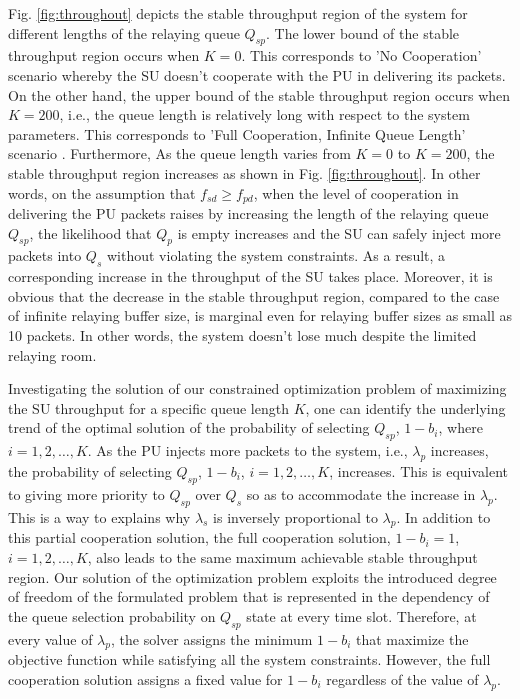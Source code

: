 \documentclass[conference]{IEEEtran}
\begin{document}
Fig. \ref{fig:throughout} depicts the stable throughput region of 
the system for different lengths of the relaying queue $Q_{sp}$. 
The lower bound of the stable throughput region occurs when $K=0$.
This corresponds to 'No Cooperation' scenario whereby the SU doesn't 
cooperate with the PU in delivering its packets. 
On the other hand, the upper bound of the stable throughput region 
occurs when $K=200$, i.e., the queue length is relatively long with 
respect to the system parameters. This corresponds to 
'Full Cooperation, Infinite Queue Length' scenario \cite{R_CoopAcc}. 
Furthermore, As the queue length varies from $K=0$ to $K=200$, 
the stable throughput region increases as shown in Fig. \ref{fig:throughout}. 
In other words, on the assumption that $f_{sd} \geq f_{pd}$, 
when the level of cooperation in delivering the PU packets raises by 
increasing the length of the relaying queue $Q_{sp}$, the likelihood that 
$Q_p$ is empty increases and the SU can safely inject more packets 
into $Q_s$ without violating the system constraints. As a result, 
a corresponding increase in the throughput of the SU takes place. 
Moreover, it is obvious that the decrease in the stable throughput region, 
compared to the case of infinite relaying buffer size, is marginal 
even for relaying buffer sizes as small as 10 packets. 
In other words, the system doesn't lose much despite the limited relaying room.





Investigating the solution of our constrained optimization problem
of maximizing the SU throughput for a specific queue length $K$,
one can identify the underlying trend of the optimal solution of
the probability of selecting $Q_{sp}$, $1-b_i$, where $i=1,2,\ldots,K$.
As the PU injects more packets to the system, i.e., $\lambda_p$
increases, the probability of selecting $Q_{sp}$,
$1-b_i$, $i=1,2,\ldots,K$, increases. This is equivalent to
giving more priority to $Q_{sp}$ over $Q_s$ so as to accommodate the increase in
$\lambda_p$. This is a way to explains why $\lambda_s$ is
inversely proportional to $\lambda_p$. In addition to this partial cooperation solution, 
the full cooperation solution, $1-b_i=1$, $i=1,2,\ldots,K$,
also leads to the same maximum achievable stable throughput region. Our
solution of the optimization problem exploits the introduced
degree of freedom of the formulated problem that is represented in
the dependency of the queue selection probability on 
$Q_{sp}$ state at every time slot. Therefore, at
every value of $\lambda_p$, the solver assigns the minimum
$1-b_i$ that maximize the objective function
while satisfying all the system constraints. However, the full
cooperation solution assigns a fixed value for $1-b_i$
regardless of the value of $\lambda_p$.
\end{document}
